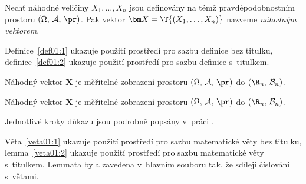\begin{definice}\label{def01:2}
  Nechť náhodné veličiny $X_1,\dots,X_n$ jsou definovány na témž
  pravděpodobnostním prostoru $(\Omega,\,\mathcal{A},\,\pr)$. Pak
  vektor $\bm X = \T{(X_1,\dots,X_n)}$ nazveme \emph{náhodným
    vektorem}.
\end{definice}
Definice~\ref{def01:1} ukazuje použití prostředí pro sazbu definice
bez titulku, definice~\ref{def01:2} ukazuje použití prostředí pro
sazbu definice s~titulkem.

\begin{veta}\label{veta01:1}
  Náhodný vektor $\bm X$ je měřitelné zobrazení prostoru
  $(\Omega,\,\mathcal{A},\,\pr)$ do $(\R_n,\,\mathcal{B}_n)$.
\end{veta}

\begin{lemma}\label{veta01:2}
  Náhodný vektor $\bm X$ je měřitelné zobrazení prostoru
  $(\Omega,\,\mathcal{A},\,\pr)$ do $(\R_n,\,\mathcal{B}_n)$.
\end{lemma}
\begin{dukaz}
  Jednotlivé kroky důkazu jsou podrobně popsány v~práci \citet[str.
  29]{Andel07}.
\end{dukaz}
Věta~\ref{veta01:1} ukazuje použití prostředí pro sazbu matematické
věty bez titulku, lemma~\ref{veta01:2} ukazuje použití prostředí pro
sazbu matematické věty s~titulkem. Lemmata byla zavedena v~hlavním
souboru tak, že sdílejí číslování s~větami.
